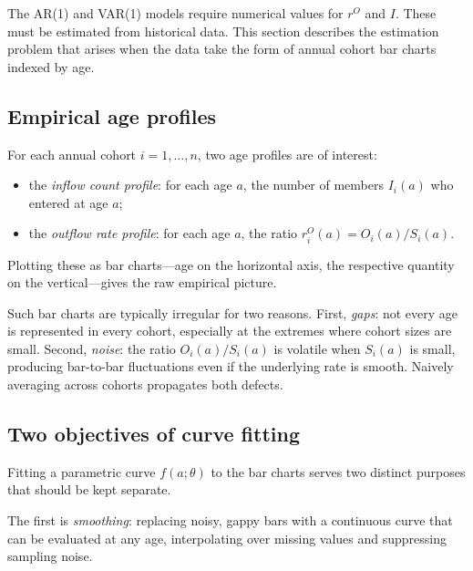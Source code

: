 \documentclass[a4paper,oneside,12pt]{extarticle}
\theoremstyle{plain}
\theoremstyle{definition}
\theoremstyle{remark}
\begin{document}
The AR(1) and VAR(1) models require numerical values for $r^O$ and $I$.
These must be estimated from historical data. This section describes the
estimation problem that arises when the data take the form of annual
cohort bar charts indexed by age.

\subsection{Empirical age profiles}

For each annual cohort $i = 1,\ldots,n$, two age profiles are of interest:
\begin{itemize}
\item the \emph{inflow count profile}: for each age $a$, the number of
  members $I_i(a)$ who entered at age $a$;
\item the \emph{outflow rate profile}: for each age $a$, the ratio
  $r_i^O(a) = O_i(a)/S_i(a)$.
\end{itemize}
Plotting these as bar charts---age on the horizontal axis, the respective
quantity on the vertical---gives the raw empirical picture.

Such bar charts are typically irregular for two reasons. First,
\emph{gaps}: not every age is represented in every cohort, especially at
the extremes where cohort sizes are small. Second, \emph{noise}: the ratio
$O_i(a)/S_i(a)$ is volatile when $S_i(a)$ is small, producing
bar-to-bar fluctuations even if the underlying rate is smooth.
Naively averaging across cohorts propagates both defects.

\subsection{Two objectives of curve fitting}

Fitting a parametric curve $f(a;\theta)$ to the bar charts serves two
distinct purposes that should be kept separate.

The first is \emph{smoothing}: replacing noisy, gappy bars with a
continuous curve that can be evaluated at any age, interpolating over
missing values and suppressing sampling noise.
\end{document}
